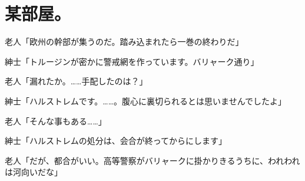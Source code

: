 \section*{某部屋。}

老人「欧州の幹部が集うのだ。踏み込まれたら一巻の終わりだ」

紳士「トルージンが密かに警戒網を作っています。バリャーク通り」

老人「漏れたか。……手配したのは？」

紳士「ハルストレムです。……。腹心に裏切られるとは思いませんでしたよ」

老人「そんな事もある……」

紳士「ハルストレムの処分は、会合が終ってからにします」

老人「だが、都合がいい。高等警察がバリャークに掛かりきるうちに、われわれは河向いだな」
